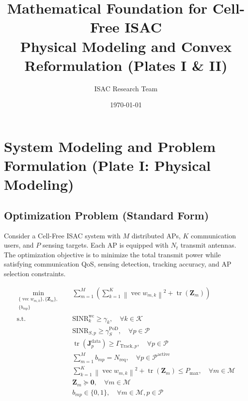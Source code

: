 \documentclass[12pt,a4paper]{article}
\title{\textbf{Mathematical Foundation for Cell-Free ISAC}\\\large Physical Modeling and Convex Reformulation (Plates I \& II)}
\author{ISAC Research Team}
\date{\today}
\DeclareMathOperator{\tr}{tr}
\DeclareMathOperator{\vect}{vec}
\newcommand{\mat}[1]{\mathbf{#1}}
\newcommand{\norm}[1]{\left\|#1\right\|}
\begin{document}
\maketitle
\tableofcontents
\newpage

\section{System Modeling and Problem Formulation (Plate I: Physical Modeling)}

\subsection{Optimization Problem (Standard Form)}

Consider a Cell-Free ISAC system with $M$ distributed APs, $K$ communication users, and $P$ sensing targets. Each AP is equipped with $N_t$ transmit antennas. The optimization objective is to minimize the total transmit power while satisfying communication QoS, sensing detection, tracking accuracy, and AP selection constraints.

\begin{align}
\min_{\substack{\{\vect{w}_{m,k}\}, \{\mat{Z}_m\}, \\ \{b_{mp}\}}} \quad & \sum_{m=1}^{M} \left( \sum_{k=1}^{K} \norm{\vect{w}_{m,k}}^2 + \tr(\mat{Z}_m) \right) \tag{P1} \\
\text{s.t.} \quad & \text{SINR}_k^{\text{wc}} \geq \gamma_k, \quad \forall k \in \mathcal{K} \label{eq:sinr_comm} \\
& \text{SINR}_{S,p} \geq \gamma_S^{\text{PoD}}, \quad \forall p \in \mathcal{P} \label{eq:sinr_sens} \\
& \tr(\mat{J}_p^{\text{data}}) \geq \Gamma_{\text{Track}, p}, \quad \forall p \in \mathcal{P} \label{eq:pcrb} \\
& \sum_{m=1}^{M} b_{mp} = N_{\text{req}}, \quad \forall p \in \mathcal{P}^{\text{active}} \label{eq:ap_select} \\
& \sum_{k=1}^{K} \norm{\vect{w}_{m,k}}^2 + \tr(\mat{Z}_m) \leq P_{\max}, \quad \forall m \in \mathcal{M} \label{eq:power} \\
& \mat{Z}_m \succeq \mat{0}, \quad \forall m \in \mathcal{M} \label{eq:psd} \\
& b_{mp} \in \{0, 1\}, \quad \forall m \in \mathcal{M}, p \in \mathcal{P} \label{eq:binary}
\end{align}
\end{document}
